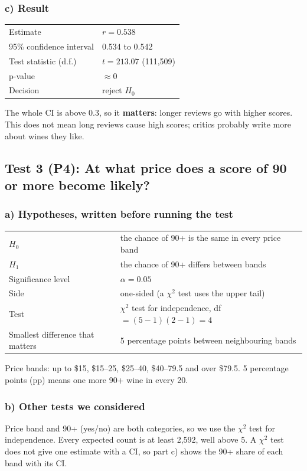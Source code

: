 \documentclass[10pt,a4paper,twocolumn]{article}
\begin{document}
\subsubsection*{c) Result}
{\small
\begin{tabularx}{\columnwidth}{@{}HL@{}}
\toprule
Estimate & $r = 0.538$\\
95\% confidence interval & 0.534 to 0.542\\
Test statistic (d.f.) & $t = 213.07$ (111,509)\\
p-value & $\approx 0$\\
Decision & reject $H_0$\\
\bottomrule
\end{tabularx}\par}

The whole CI is above 0.3, so it \textbf{matters}: longer reviews go with higher scores. This does not mean long
reviews cause high scores; critics probably write more about wines they like.

\subsection*{Test 3 (P4): At what price does a score of 90 or more become likely?}

\subsubsection*{a) Hypotheses, written before running the test}
{\small
\begin{tabularx}{\columnwidth}{@{}HL@{}}
\toprule
$H_0$ & the chance of 90+ is the same in every price band\\
$H_1$ & the chance of 90+ differs between bands\\
Significance level & $\alpha = 0.05$\\
Side & one-sided (a $\chi^2$ test uses the upper tail)\\
Test & $\chi^2$ test for independence, df $= (5-1)(2-1) = 4$\\
Smallest difference that matters & 5 percentage points between neighbouring bands\\
\bottomrule
\end{tabularx}\par}

Price bands: up to \$15, \$15--25, \$25--40, \$40--79.5 and over \$79.5. 5 percentage points (pp) means one more 90+
wine in every 20.

\subsubsection*{b) Other tests we considered}
Price band and 90+ (yes/no) are both categories, so we use the $\chi^2$ test for independence. Every expected count is
at least 2,592, well above 5. A $\chi^2$ test does not give one estimate with a CI, so part c) shows the 90+ share of
each band with its CI.
\end{document}
